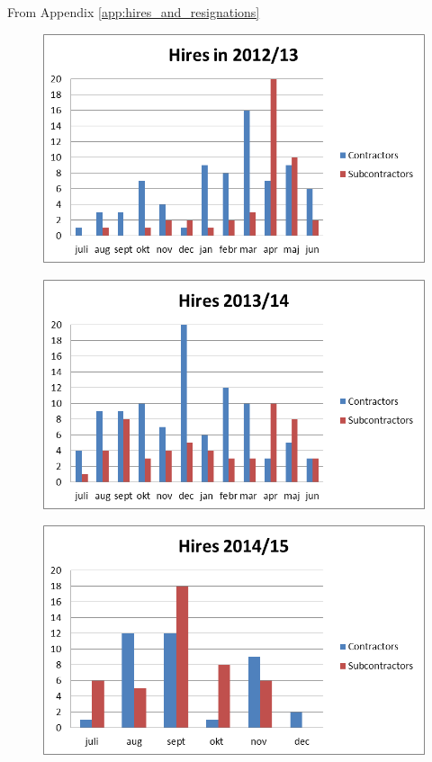 \label{app:recruitment_data}
From Appendix \ref{app:hires_and_resignations}
\begin{figure}[htp]
\centering
\includegraphics[scale=0.60]{appendix/hires_2012_13.png}
\end{figure}
\begin{figure}[htp]
\centering
\includegraphics[scale=0.60]{appendix/hires_2013_14.png}
\end{figure}
\begin{figure}[htp]
\centering
\includegraphics[scale=0.60]{appendix/hires_2014_15.png}
\end{figure}
